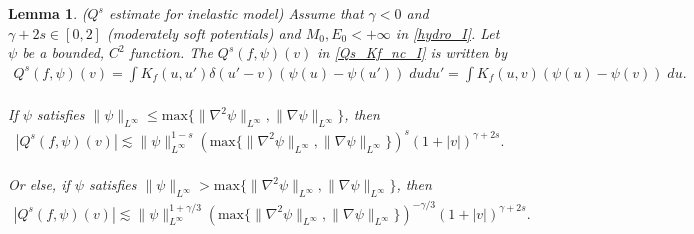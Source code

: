 \documentclass[reqno,10pt]{amsart}
\newtheorem{lemma}[theorem]{Lemma}
\numberwithin{equation}{section}
\begin{document}
\begin{lemma} ($Q^s$ estimate for inelastic model) \label{Q_est_I} Assume that $\gamma<0$ and $\gamma+2s \in [0,2]$ (moderately soft potentials) and $M_0, E_0 < +\infty$ in \eqref{hydro_I}. Let $\psi$ be a bounded, $C^2$ function. The $Q^{s}(f,\psi)(v)$ in \eqref{Qs_Kf_nc_I} is written by
\begin{align*}
    Q^{s}(f,\psi)(v) = \int K_f(u,u')\delta(u'-v)(\psi(u)-\psi(u')) \; dudu' =\int K_f(u,v)(\psi(u)-\psi(v)) \; du.
\end{align*} \\ 
If $\psi$ satisfies $\|\psi\|_{L^{\infty}} \leq \text{max} \{\|\nabla^2 \psi\|_{L^\infty}, \|\nabla\psi\|_{L^\infty} \}$, then 
\begin{align} \label{Q_est_1_I}
     |Q^{s}(f,\psi)(v)| 
    \lesssim
  \|\psi\|_{L^{\infty}}^{1-s}(\text{max}\{\|\nabla^2 \psi\|_{L^\infty}, \|\nabla \psi\|_{L^\infty} \})^{s}(1+|v|)^{\gamma+2s}.
\end{align} \\
Or else, if $\psi$ satisfies $\|\psi\|_{L^{\infty}} > \text{max} \{\|\nabla^2 \psi\|_{L^\infty}, \|\nabla\psi\|_{L^\infty} \}$, then
\begin{align} \label{Q_est_2_I}
     |Q^{s}(f,\psi)(v)| 
    \lesssim
    \|\psi\|_{L^{\infty}}^{1+\gamma/3}(\text{max}\{\|\nabla^2 \psi\|_{L^\infty}, \|\nabla \psi\|_{L^\infty} \})^{-\gamma/3}(1+|v|)^{\gamma+2s}.
\end{align}
\end{lemma}
\end{document}
